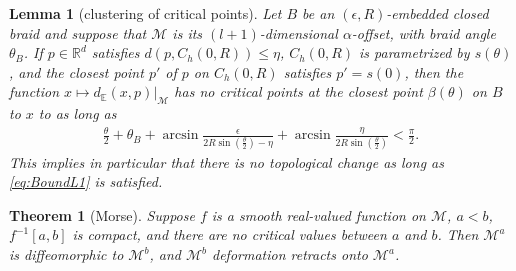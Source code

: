 \documentclass[10pt,a4paper]{amsart}
\newtheorem{lemma}{Lemma}
\newtheorem{theorem}{Theorem}
\newcommand{\M}{\mathcal{M}}
\begin{document}
\begin{lemma}[clustering of critical points] \label{Lem:Step2} Let $B$ be an $(\epsilon,R)$-embedded closed braid and suppose that $\M$ is its $(l+1)$-dimensional $\alpha$-offset, with braid angle $\theta_B$. If $p \in \mathbb{R}^d$ satisfies $d (p, C_h(0,R)) \leq \eta$, $C_h(0,R)$ is parametrized by $s(\theta)$, and the closest point $p'$ of $p$ on $C_h(0,R)$ satisfies $p' =s(0)$, then the function $x \mapsto d_\mathbb{E}(x, p)|_\M$ has no critical points at the closest point $\beta (\theta)$ on $B$ to $x$ to as long as  
\begin{align}  \frac{\theta}{2} + \theta_B + \arcsin \frac{\epsilon} { 2 R \sin (\frac{\theta}{2})  -\eta } +\arcsin \frac{\eta} { 2 R \sin (\frac{\theta}{2})  }  <\frac{\pi}{ 2} .
\label{eq:BoundL1}
\end{align} 
This implies in particular that there is no topological change as long as \eqref{eq:BoundL1} is satisfied. 
%
%
%
\end{lemma} 

\begin{theorem}[Morse]\label{th:Morse} 
Suppose $f$ is a smooth real-valued function on $\M$, $a < b$, $f^{-1} [ a , b ]$ is compact, and there are no critical values between $a$ and $b$. Then $\M^a$ is diffeomorphic to $\M^{b}$, and $\M^{b}$ deformation retracts onto $\M^{a}$. 
\end{theorem}
\end{document}
